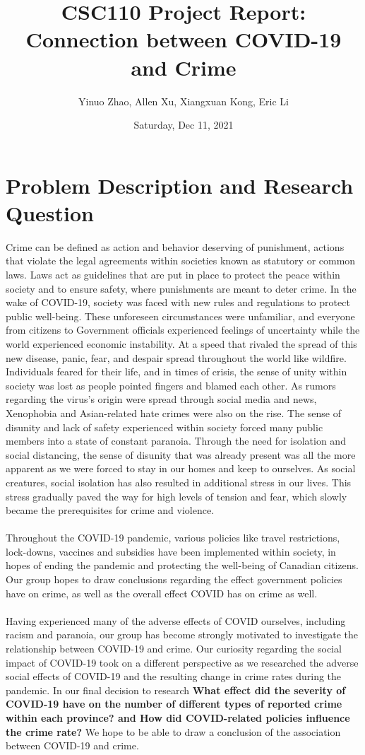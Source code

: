 \documentclass[fontsize=11pt]{article}
\title{CSC110 Project Report: Connection between COVID-19 and Crime}
\author{Yinuo Zhao, Allen Xu, Xiangxuan Kong, Eric Li}
\date{Saturday, Dec 11, 2021}
\begin{document}
\maketitle

\section*{Problem Description and Research Question}
Crime can be defined as action and behavior deserving of punishment, actions that violate the legal agreements within societies known as statutory or common laws. Laws act as guidelines that are put in place to protect the peace within society and to ensure safety, where punishments are meant to deter crime. 
In the wake of COVID-19, society was faced with new rules and regulations to protect public well-being. These unforeseen circumstances were unfamiliar, and everyone from citizens to Government officials experienced feelings of uncertainty while the world experienced economic instability. At a speed that rivaled the spread of this new disease, panic, fear, and despair spread throughout the world like wildfire. Individuals feared for their life, and in times of crisis, the sense of unity within society was lost as people pointed fingers and blamed each other. As rumors regarding the virus's origin were spread through social media and news, Xenophobia and Asian-related hate crimes were also on the rise. The sense of disunity and lack of safety experienced within society forced many public members into a state of constant paranoia. Through the need for isolation and social distancing, the sense of disunity that was already present was all the more apparent as we were forced to stay in our homes and keep to ourselves. As social creatures, social isolation has also resulted in additional stress in our lives. This stress gradually paved the way for high levels of tension and fear, which slowly became the prerequisites for crime and violence.
\\
\\
Throughout the COVID-19 pandemic, various policies like travel restrictions, lock-downs, vaccines and subsidies have been implemented within society, in hopes of ending the pandemic and protecting the well-being of Canadian citizens. Our group hopes to draw conclusions regarding the effect government policies have on crime, as well as the overall effect COVID has on crime as well.
\\
\\
Having experienced many of the adverse effects of COVID ourselves, including racism and paranoia, our group has become strongly motivated to investigate the relationship between COVID-19 and crime.  Our curiosity regarding the social impact of COVID-19 took on a different perspective as we researched the adverse social effects of COVID-19 and the resulting change in crime rates during the pandemic. In our final decision to research \textbf{What effect did the severity of COVID-19 have on the number of different types of reported crime within each province? and How did COVID-related policies influence the crime rate?} We hope to be able to draw a conclusion of the association between COVID-19 and crime.
 
\end{document}
